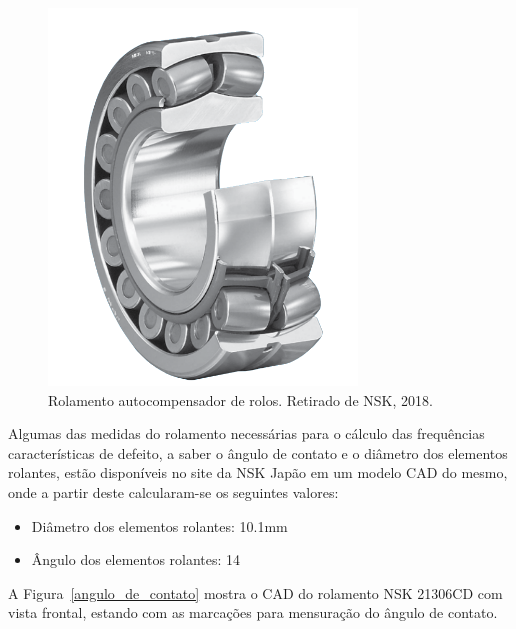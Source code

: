 \documentclass[
	12pt,				
	oneside,			
	a4paper,			
	english,			
	brazil,			
	]{abntex2ppgsi}
\begin{document}
\begin{figure}[H]
\centering
\includegraphics[width=\textwidth,height=100mm,keepaspectratio]{Figura24}
\caption {Rolamento autocompensador de rolos. Retirado de NSK, 2018.}
\label{Figura24}
\end{figure} 

Algumas das medidas do rolamento necessárias para o cálculo das frequências características de defeito, a saber o ângulo de contato e o diâmetro dos elementos rolantes, estão disponíveis no site da NSK Japão em um modelo CAD do mesmo, onde a partir deste calcularam-se os seguintes valores:

\begin{itemize}
	\item Diâmetro dos elementos rolantes: 10.1\si{\mm}
	\item Ângulo dos elementos rolantes: 14\textdegree
\end{itemize}

A Figura~\ref{angulo_de_contato} mostra o CAD do rolamento NSK 21306CD com vista frontal, estando com as marcações para mensuração do ângulo de contato. 
\end{document}
